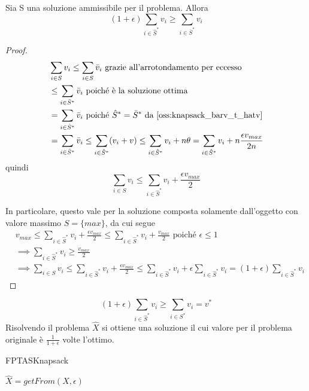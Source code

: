 \begin{lemma}
	Sia S una soluzione ammissibile per il problema. Allora
	$$
		(1+\epsilon)\sum_{i \in \hat{S}^*} v_i \geq \sum_{i \in \bar{S}^*} v_i
	$$
\end{lemma}
\begin{proof}
	\begin{align*}
		 & \sum_{i \in S} v_i \leq \sum_{i \in S} \bar{v}_i  \text{ grazie all'arrotondamento per eccesso}                      \\
		 & \leq \sum_{ i \in \bar{S}^*} \bar{v}_i  \text{ poiché è la soluzione ottima}                                         \\
		 & = \sum_{ i \in \hat{S}^*} \bar{v}_i \text{ poiché } \hat{S}^* = \bar{S}^* \text{ da \cref{oss:knapsack_barv_t_hatv}} \\
		 & = \sum_{i \in \bar{S}^*} \bar{v}_i \leq \sum_{i \in \hat{S}^*} (v_i + v) \leq
		\sum_{i \in \hat{S}^*} v_i + n \theta = \sum_{i \in \hat{S}^*} v_i + n \frac{\epsilon v_{max}}{2 n}
	\end{align*}
	quindi
	$$
		\sum_{i \in S} v_i  \leq \sum_{i \in \hat{S}^*} v_i + \frac{\epsilon v_{max}}{2}
	$$

	In particolare, questo vale per la soluzione composta
	solamente dall'oggetto con valore massimo $S = \{max\}$, da cui segue
	\begin{align*}
		 & v_{max} \leq \sum_{i \in \hat{S}^*} v_i + \frac{\epsilon v_{max}}{2}
		\leq \sum_{i \in \hat{S}^*} v_i + \frac{v_{max}}{2} \text{ poiché } \epsilon \leq 1         \\
		 & \implies \sum_{i \in \hat{S}^*} v_i \geq \frac{v_{max}}{2}                               \\
		 & \implies \sum_{i \in S} v_i \leq \sum_{i \in \hat{S}^*} v_i + \frac{\epsilon v_{max}}{2}
		\leq \sum_{i \in \hat{S}^*}v_i + \epsilon \sum_{i \in \hat{S}^*} v_i = (1 + \epsilon) \sum_{i \in \hat{S}^*} v_i
	\end{align*}
\end{proof}
\begin{theorem}
	$$
		(1+\epsilon)\sum_{i \in \hat{S}^*} v_i \geq \sum_{i \in S^*} v_i = v^*
	$$
	Risolvendo il problema $\hat{X}$ si ottiene una soluzione il cui valore
	per il problema originale è
	$\frac{1}{1+\epsilon}$
	volte l'ottimo.
\end{theorem}

\begin{algorithm}
	\caption{FPTASKnapsack}
	\label{algo:FPTASKnapsack}

	$
		\hat{X} = getFrom(X, \epsilon)
	$


\end{algorithm}

